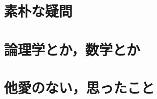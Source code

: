 ﻿\normalsize

    \chapter{素朴な疑問}
        


    \chapter{論理学とか，数学とか}
        

    \chapter{他愛のない，思ったこと}
        

